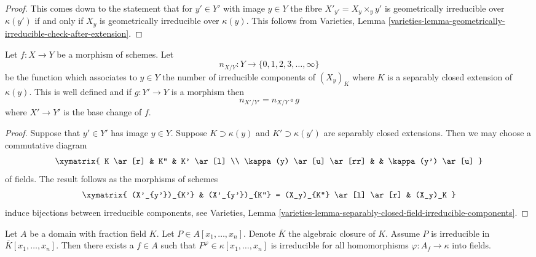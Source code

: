 \begin{proof}
This comes down to the statement that for $y' \in Y'$ with image
$y \in Y$ the fibre $X'_{y'} = X_y \times_y y'$ is geometrically
irreducible over $\kappa(y')$ if and only if $X_y$ is geometrically
irreducible over $\kappa(y)$. This follows from
Varieties,
Lemma \ref{varieties-lemma-geometrically-irreducible-check-after-extension}.
\end{proof}

\begin{lemma}
\label{lemma-base-change-fibres-nr-geometrically-irreducible-components}
Let $f : X \to Y$ be a morphism of schemes. Let
$$
n_{X/Y} : Y \to \{0, 1, 2, 3, \ldots, \infty\}
$$
be the function which associates to $y \in Y$ the number of irreducible
components of $(X_y)_K$ where $K$ is a separably closed extension
of $\kappa(y)$. This is well defined and if $g : Y' \to Y$ is a morphism
then
$$
n_{X'/Y'} = n_{X/Y} \circ g
$$
where $X' \to Y'$ is the base change of $f$.
\end{lemma}

\begin{proof}
Suppose that $y' \in Y'$ has image $y \in Y$.
Suppose $K \supset \kappa(y)$ and $K' \supset \kappa(y')$ are separably
closed extensions. Then we may choose a commutative diagram
$$
\xymatrix{
K \ar[r] & K'' & K' \ar[l] \\
\kappa(y) \ar[u] \ar[rr] & & \kappa(y') \ar[u]
}
$$
of fields. The result follows as the morphisms of schemes
$$
\xymatrix{
(X'_{y'})_{K'} &
(X'_{y'})_{K''} = (X_y)_{K''} \ar[l] \ar[r] &
(X_y)_K
}
$$
induce bijections between irreducible components, see
Varieties,
Lemma \ref{varieties-lemma-separably-closed-field-irreducible-components}.
\end{proof}

\begin{lemma}
\label{lemma-irreducible-polynomial-over-domain}
Let $A$ be a domain with fraction field $K$.
Let $P \in A[x_1, \ldots, x_n]$.
Denote $\overline{K}$ the algebraic closure of $K$.
Assume $P$ is irreducible in $\overline{K}[x_1, \ldots, x_n]$.
Then there exists a $f \in A$ such that
$P^\varphi \in \kappa[x_1, \ldots, x_n]$ is irreducible for all
homomorphisms $\varphi : A_f \to \kappa$ into fields.
\end{lemma}

